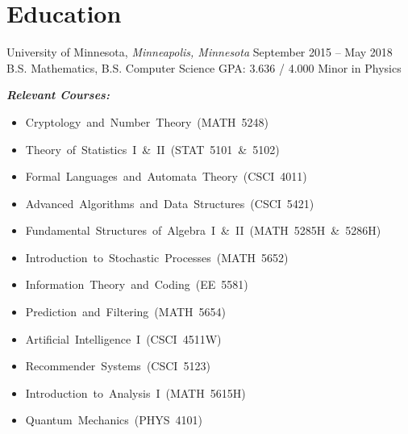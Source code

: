 \section{Education}
\block
  {University of Minnesota, {\normalfont \it Minneapolis, Minnesota}}
  {September 2015 -- May 2018}
  {B.S. Mathematics, B.S. Computer Science}
  {GPA: 3.636 / 4.000}
  {Minor in Physics}
  {}

{
  \descriptionsize
  \setlength{\columnsep}{65pt}
  \textbf{\emph{Relevant Courses:}}
  \begin{multicols}{2}
    \begin{itemize}
      \item \mbox{Cryptology and Number Theory (MATH 5248)}
      \item \mbox{Theory of Statistics I \& II (STAT 5101 \& 5102)}
      \item \mbox{Formal Languages and Automata Theory (CSCI 4011)}
      \item \mbox{Advanced Algorithms and Data Structures (CSCI 5421)}
      \item \mbox{Fundamental Structures of Algebra I \& II (MATH 5285H \& 5286H)}
      \item \mbox{Introduction to Stochastic Processes (MATH 5652)}
      \item \mbox{Information Theory and Coding (EE 5581)}
      \item \mbox{Prediction and Filtering (MATH 5654)}
      \item \mbox{Artificial Intelligence I (CSCI 4511W)}
      \item \mbox{Recommender Systems (CSCI 5123)}
      \item \mbox{Introduction to Analysis I (MATH 5615H)}
      \item \mbox{Quantum Mechanics (PHYS 4101)}
    \end{itemize}
  \end{multicols}
}
